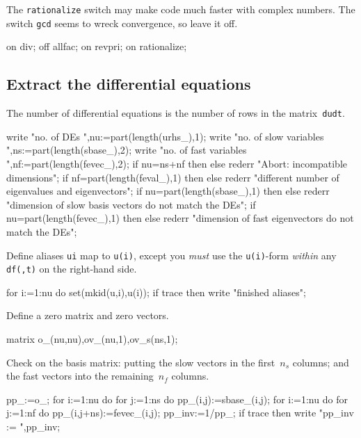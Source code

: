 \documentclass[11pt,a5paper]{article}
\begin{document}
The \verb|rationalize| switch may make code much faster with
complex numbers. The switch \verb|gcd| seems to wreck
convergence, so leave it off.
\begin{reduce}
on div; off allfac; on revpri; 
on rationalize; %
\end{reduce}







\subsection{Extract the differential equations}

The number of differential equations is the number of rows in the
matrix~\verb|dudt|.
\begin{reduce}
write "no. of DEs ",nu:=part(length(urhs_),1);
write "no. of slow variables ",ns:=part(length(sbase_),2);
write "no. of fast variables ",nf:=part(length(fevec_),2);
if nu=ns+nf then else rederr "Abort: incompatible dimensions";
if nf=part(length(feval_),1) then 
else rederr "different number of eigenvalues and eigenvectors";
if nu=part(length(sbase_),1) then
else rederr "dimension of slow basis vectors do not match the DEs";
if nu=part(length(fevec_),1) then
else rederr "dimension of fast eigenvectors do not match the DEs";
\end{reduce}
Define aliases \verb|ui| map to \verb|u(i)|, except you 
\emph{must} use the \verb|u(i)|-form \emph{within} any 
\verb|df(,t)| on the right-hand side.
\begin{reduce}
for i:=1:nu do set(mkid(u,i),u(i));
if trace then write "finished aliases";
\end{reduce}

Define a zero matrix and zero vectors.
\begin{reduce}
matrix o_(nu,nu),ov_(nu,1),ov_s(ns,1);
\end{reduce}

Check on the basis matrix: putting the slow vectors in the
first~\(n_s\) columns; and the fast vectors into the
remaining~\(n_f\) columns.
\begin{reduce}
pp_:=o_;
for i:=1:nu do for j:=1:ns do pp_(i,j):=sbase_(i,j);
for i:=1:nu do for j:=1:nf do pp_(i,j+ns):=fevec_(i,j);
pp_inv:=1/pp_;
if trace then write "pp_inv := ",pp_inv;
\end{reduce}
\end{document}

